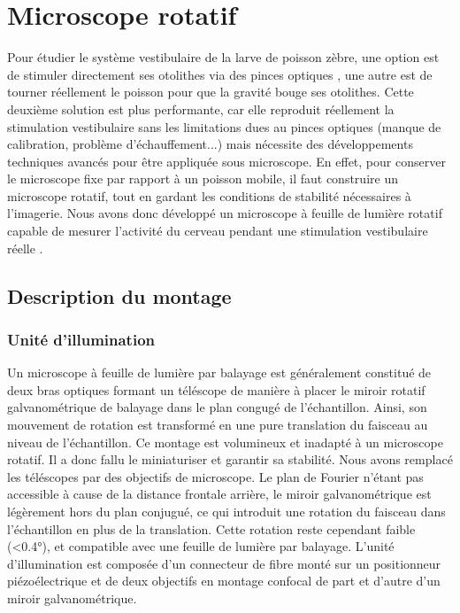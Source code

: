 
\section{Microscope rotatif}

Pour étudier le système vestibulaire de la larve de poisson zèbre, une option est de stimuler directement ses otolithes via des pinces optiques \cite{favre-bulle_optical_2017}, une autre est de tourner réellement le poisson pour que la gravité bouge ses otolithes. Cette deuxième solution est plus performante, car elle reproduit réellement la stimulation vestibulaire sans les limitations dues au pinces optiques (manque de calibration, problème d'échauffement...) mais nécessite des développements techniques avancés pour être appliquée sous microscope. En effet, pour conserver le microscope fixe par rapport à un poisson mobile, il faut construire un microscope rotatif, tout en gardant les conditions de stabilité nécessaires à l'imagerie. Nous avons donc développé un microscope à feuille de lumière rotatif capable de mesurer l'activité du cerveau pendant une stimulation vestibulaire réelle \cite{migault_whole-brain_2018}.

\subsection{Description du montage}

\subsubsection{Unité d'illumination}

Un microscope à feuille de lumière par balayage est généralement constitué de deux bras optiques formant un téléscope de manière à placer le miroir rotatif galvanométrique de balayage dans le plan congugé de l'échantillon. Ainsi, son mouvement de rotation est transformé en une pure translation du faisceau au niveau de l'échantillon. Ce montage est volumineux et inadapté à un microscope rotatif. Il a donc fallu le miniaturiser et garantir sa stabilité. Nous avons remplacé les téléscopes par des objectifs de microscope. Le plan de Fourier n'étant pas accessible à cause de la distance frontale arrière, le miroir galvanométrique est légèrement hors du plan conjugué, ce qui introduit une rotation du faisceau dans l'échantillon en plus de la translation. Cette rotation reste cependant faible (<0.4°), et compatible avec une feuille de lumière par balayage.  
L'unité d'illumination est composée d'un connecteur de fibre monté sur un positionneur piézoélectrique et de deux objectifs en montage confocal de part et d'autre d'un miroir galvanométrique. 

